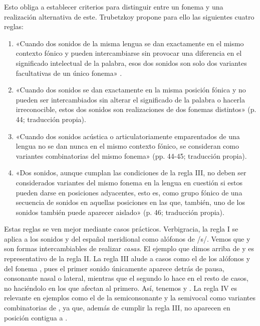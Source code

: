 Esto obliga a establecer criterios para distinguir entre un fonema y una realización alternativa de este. Trubetzkoy \parencite*[42-46]{trubetzkoy1939} propone para ello las siguientes cuatro reglas:
\begin{enumerate}[label=\Roman*]
	\item «Cuando dos sonidos de la misma lengua se dan exactamente en el mismo contexto fónico y pueden intercambiarse sin provocar una diferencia en el significado intelectual de la palabra, esos dos sonidos son solo dos variantes facultativas de un único fonema» \parencite[p. 42; traducción propia]{trubetzkoy1939}. 
	\item «Cuando dos sonidos se dan exactamente en la misma posición fónica y no pueden ser intercambiados sin alterar el significado de la palabra o hacerla irreconocible, estos dos sonidos son realizaciones de dos fonemas distintos» (p. 44; traducción propia).
	\item  «Cuando dos sonidos acústica o articulatoriamente emparentados de una lengua no se dan nunca en el mismo contexto fónico, se consideran como variantes combinatorias del mismo fonema» (pp. 44-45; traducción propia).
	\item «Dos sonidos, aunque cumplan las condiciones de la regla III, no deben ser considerados variantes del mismo fonema en la lengua en cuestión si estos pueden darse en posiciones adyacentes, esto es, como grupo fónico de una secuencia de sonidos en aquellas posiciones en las que, también, uno de los sonidos también puede aparecer aislado» (p. 46; traducción propia).
\end{enumerate}
Estas reglas se ven mejor mediante casos prácticos. Verbigracia, la regla I se aplica a los sonidos \ipa{[h]} y \ipa{[s]} del español meridional como alófonos de /s/. Vemos que \ipa{[ˈkasah]} y \ipa{[ˈkasas]} son formas intercambiables de realizar \textit{casas}. El ejemplo que dimos arriba de  y  es representativo de la regla II. La regla III alude a casos como el de los alófonos \ipa{[d]} y \ipa{[ð]} del fonema , pues el primer sonido únicamente aparece detrás de pausa, consonante nasal o lateral, mientras que el segundo lo hace en el resto de casos, no haciéndolo en los que afectan al primero. Así, tenemos \ipa{[esˈpalda]} y \ipa{[esˈpaða]}. La regla IV es relevante en ejemplos como el de la  semiconsonante \ipa{[w]} y la semivocal \ipa{[u̯]} como variantes combinatorias de , ya que, además de cumplir la regla III, no aparecen en posición contigua a \ipa{[u]}.
 
